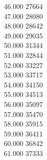 { 46.000	27664 \\
 47.000	28080 \\
 48.000	28642 \\
 49.000	29035 \\
 50.000	31344 \\
 51.000	32844 \\
 52.000	33227 \\
 53.000	33717 \\
 54.000	34150 \\
 55.000	34513 \\
 56.000	35097 \\
 57.000	35470 \\
 58.000	35915 \\
 59.000	36411 \\
 60.000	36842 \\
 61.000	37333 \\
}
